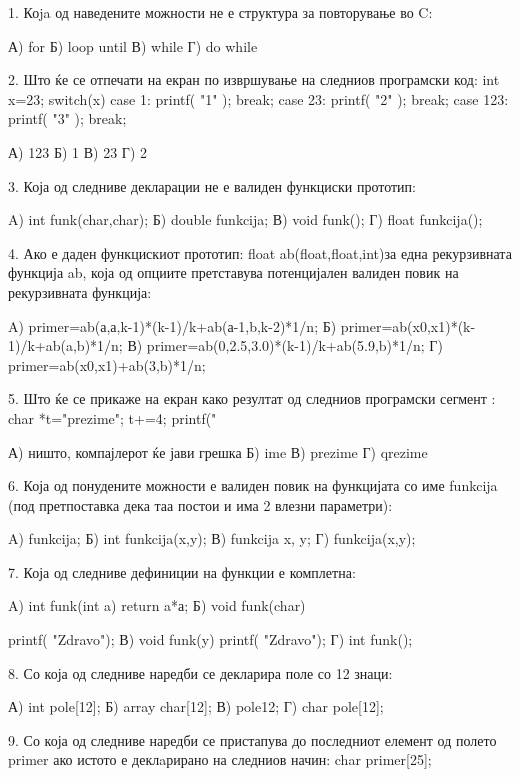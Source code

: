 {{{{{{{1. Коja од наведените можности не е структура за повторување во C:

А) for                  Б) loop until
В) while                Г) do while

2. Што ќе се отпечати на екран по извршување на следниов програмски код:
int x=23;
switch(x)
{
  case 1: printf( "1" ); break;
  case 23: printf( "2" ); break;
  case 123: printf( "3" ); break;
}

А) 123                  Б) 1
В) 23                   Г) 2   


3. Која од следниве декларации не е валиден функциски прототип:

A) int funk(char,char);     Б) double funkcija;
В) void funk();         Г) float funkcija();

 
4. Ако е даден функцискиот прототип: float ab(float,float,int)за една рекурзивната функција ab, која од опциите претставува потенцијален валиден повик на рекурзивната функција:

           A) primer=ab(а,а,k-1)*(k-1)/k+ab(а-1,b,k-2)*1/n;
           Б) primer=ab(x0,x1)*(k-1)/k+ab(a,b)*1/n;
В) primer=ab(0,2.5,3.0)*(k-1)/k+ab(5.9,b)*1/n; 
Г) primer=ab(x0,x1)+ab(3,b)*1/n;


5. Што ќе се прикаже на екран како резултат од следниов програмски сегмент :       char *t="prezime"; t+=4;     printf("%

А) ништо, компајлерот ќе јави грешка    Б) ime
В) prezime                  Г) qrezime


6. Која од понудените можности е валиден повик на функцијата со име funkcija (под претпоставка дека таа постои и има 2 влезни параметри):

A) funkcija;                    Б) int funkcija(x,y);
В) funkcija x, y;               Г) funkcija(x,y);

7. Која од следниве дефиниции на функции е комплетна:

A) int funk(int a) {return a*а;}        
Б) void funk(char) { printf( "Zdravo");
В) void funk(y) { printf( "Zdravo"); } 
Г) int funk();

8. Со која од следниве наредби се декларира поле со 12 знаци:

А) int pole[12];                    Б) array char[12];
В) pole{12};                                            Г) char pole[12];

9. Со која од следниве наредби се пристапува до последниот елемент од полето primer ако истото е деклaрирано на следниов начин: char primer[25];

}}}}}}}}

